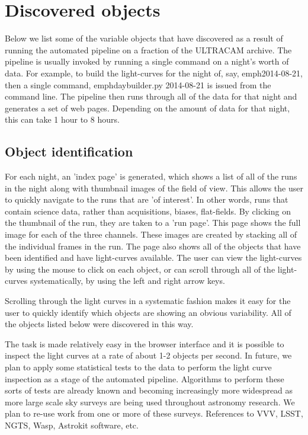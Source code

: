 \section{Discovered objects}

Below we list some of the variable objects that have discovered as a result of running the automated pipeline on a fraction of the ULTRACAM archive. The pipeline is usually invoked by running a single command on a night's worth of data. For example, to build the light-curves for the night of, say, emph{2014-08-21}, then a single command, emph{daybuilder.py 2014-08-21} is issued from the command line. The pipeline then runs through all of the data for that night and generates a set of web pages. Depending on the amount of data for that night, this can take 1 hour to 8 hours. 

\subsection{Object identification}
For each night, an 'index page' is generated, which shows a list of all of the runs in the night along with thumbnail images of the field of view. This allows the user to quickly navigate to the runs that are 'of interest'. In other words, runs that contain science data, rather than acquisitions, biases, flat-fields. By clicking on the thumbnail of the run, they are taken to a 'run page'. This page shows the full image for each of the three channels. These images are created by stacking all of the individual frames in the run. The page also shows all of the objects that have been identified and have light-curves available. The user can view the light-curves by using the mouse to click on each object, or can scroll through all of the light-curves systematically, by using the left and right arrow keys. 

Scrolling through the light curves in a systematic fashion makes it easy for the user to quickly identify which objects are showing an obvious variability. All of the objects listed below were discovered in this way. 

The task is made relatively easy in the browser interface and it is possible to inspect the light curves at a rate of about 1-2 objects per second. In future, we plan to apply some statistical tests to the data to perform the light curve inspection as a stage of the automated pipeline. Algorithms to perform these sorts of tests are already known and becoming increasingly more widespread as more large scale sky surveys are being used throughout astronomy research. We plan to re-use work from one or more of these surveys. References to VVV, LSST, NGTS, Wasp, Astrokit software, etc.


